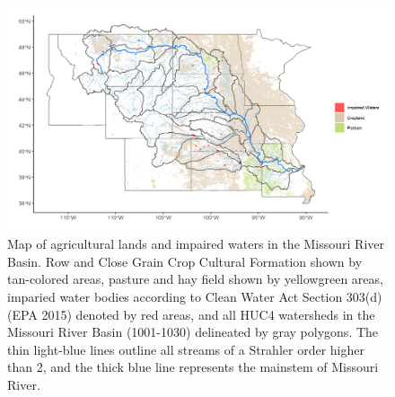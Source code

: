\documentclass[12pt,]{article}
\makeatletter
\def\maxwidth{\ifdim\Gin@nat@width>\linewidth\linewidth\else\Gin@nat@width\fi}
\makeatother
\begin{document}
\begin{figure}
\includegraphics[width=\maxwidth]{../Figures/cropland3} \caption{\label{fig:cropland} Map of agricultural lands and impaired waters in the Missouri River Basin. Row and Close Grain Crop Cultural Formation shown by tan-colored areas, pasture and hay field shown by yellowgreen areas, imparied water bodies according to Clean Water Act Section 303(d) (EPA 2015) denoted by red areas, and all HUC4 watersheds in the Missouri River Basin (1001-1030) delineated by gray polygons. The thin light-blue lines outline all streams of a Strahler order higher than 2, and the thick blue line represents the mainstem of Missouri River.}\label{fig:cropland}
\end{figure}
\end{document}
